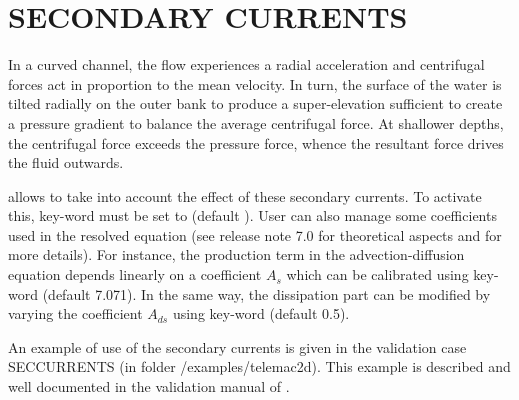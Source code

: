 


\chapter{ SECONDARY CURRENTS}
\label{ch:sec:curr}
 In a curved channel, the flow experiences a radial acceleration and centrifugal forces act in proportion to the mean velocity.  
In turn, the surface of the water is tilted radially on the outer bank to produce a super-elevation sufficient to create a pressure gradient 
to balance the average centrifugal force.  At shallower depths, the centrifugal force exceeds the pressure force, whence the resultant force 
drives the fluid outwards.

 allows to take into account the effect of these secondary currents. To activate this, key-word  must be set to  
(default ). User can also manage some coefficients used in the resolved equation (see release note 7.0 for theoretical aspects and 
for more details). For instance, the production term in the advection-diffusion equation depends linearly on a coefficient $A_s$ which can be 
calibrated using key-word (default 7.071).  In the same way, 
the dissipation part can be modified by varying the coefficient $A_{ds}$ using key-word  
(default 0.5).

 An example of use of the secondary currents is given in the validation case SECCURRENTS (in folder /examples/telemac2d). 
This example is described and well documented in the validation manual of .


